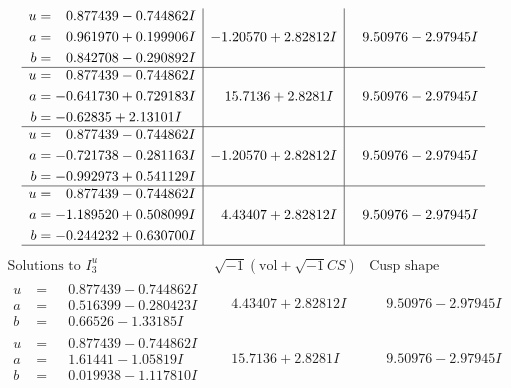 \documentclass[1p]{elsarticle_modified}
\theoremstyle{definition}
\newcommand{\I}{\sqrt{-1}}
\begin{document}
$$\begin{array}{c|c|c}
\begin{aligned}
u &= \phantom{-}0.877439 - 0.744862 I \\
a &= \phantom{-}0.961970 + 0.199906 I \\
b &= \phantom{-}0.842708 - 0.290892 I\end{aligned}
 & -1.20570 + 2.82812 I & \phantom{-}9.50976 - 2.97945 I \\ \hline\begin{aligned}
u &= \phantom{-}0.877439 - 0.744862 I \\
a &= -0.641730 + 0.729183 I \\
b &= -0.62835 + 2.13101 I\end{aligned}
 & \phantom{-}15.7136 + 2.8281 I & \phantom{-}9.50976 - 2.97945 I \\ \hline\begin{aligned}
u &= \phantom{-}0.877439 - 0.744862 I \\
a &= -0.721738 - 0.281163 I \\
b &= -0.992973 + 0.541129 I\end{aligned}
 & -1.20570 + 2.82812 I & \phantom{-}9.50976 - 2.97945 I \\ \hline\begin{aligned}
u &= \phantom{-}0.877439 - 0.744862 I \\
a &= -1.189520 + 0.508099 I \\
b &= -0.244232 + 0.630700 I\end{aligned}
 & \phantom{-}4.43407 + 2.82812 I & \phantom{-}9.50976 - 2.97945 I\\
 \hline 
 \end{array}$$\newpage$$\begin{array}{c|c|c}  
\text{Solutions to }I^u_{3}& \I (\text{vol} + \sqrt{-1}CS) & \text{Cusp shape}\\
 \hline 
\begin{aligned}
u &= \phantom{-}0.877439 - 0.744862 I \\
a &= \phantom{-}0.516399 - 0.280423 I \\
b &= \phantom{-}0.66526 - 1.33185 I\end{aligned}
 & \phantom{-}4.43407 + 2.82812 I & \phantom{-}9.50976 - 2.97945 I \\ \hline\begin{aligned}
u &= \phantom{-}0.877439 - 0.744862 I \\
a &= \phantom{-}1.61441 - 1.05819 I \\
b &= \phantom{-}0.019938 - 1.117810 I\end{aligned}
 & \phantom{-}15.7136 + 2.8281 I & \phantom{-}9.50976 - 2.97945 I \\ \hline\begin{aligned}

\end{aligned}
\end{array}$$
\end{document}
